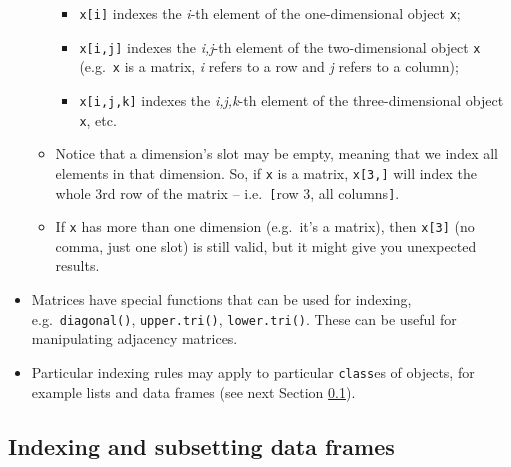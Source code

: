 \documentclass[
]{book}
\providecommand{\tightlist}{%
  \setlength{\itemsep}{0pt}\setlength{\parskip}{0pt}}
\begin{document}
\begin{itemize}
\begin{itemize}
    \begin{itemize}
    \tightlist
    \item
      \texttt{x{[}i{]}} indexes the \emph{i}-th element of the one-dimensional object \texttt{x};
    \item
      \texttt{x{[}i,j{]}} indexes the \emph{i,j}-th element of the two-dimensional object \texttt{x} (e.g.~\texttt{x} is a matrix, \emph{i} refers to a row and \emph{j} refers to a column);
    \item
      \texttt{x{[}i,j,k{]}} indexes the \emph{i,j,k}-th element of the three-dimensional object \texttt{x}, etc.
    \end{itemize}
  \item
    Notice that a dimension's slot may be empty, meaning that we index all elements in that dimension. So, if \texttt{x} is a matrix, \texttt{x{[}3,{]}} will index the whole 3rd row of the matrix -- i.e.~\texttt{{[}}row 3, all columns\texttt{{]}}.
  \item
    If \texttt{x} has more than one dimension (e.g.~it's a matrix), then \texttt{x{[}3{]}} (no comma, just one slot) is still valid, but it might give you unexpected results.
  \end{itemize}
\item
  Matrices have special functions that can be used for indexing, e.g.~\texttt{diagonal()}, \texttt{upper.tri()}, \texttt{lower.tri()}. These can be useful for manipulating adjacency matrices.
\item
  Particular indexing rules may apply to particular \texttt{class}es of objects, for example lists and data frames (see next Section \ref{index-df}).
\end{itemize}

\hypertarget{index-df}{%
\subsection{Indexing and subsetting data frames}\label{index-df}}
\end{document}
